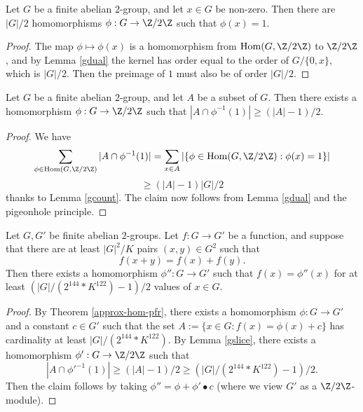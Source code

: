 \begin{lemma}[Counting]\label{gcount}\leanok Let $G$ be a finite abelian $2$-group, and let $x \in G$ be non-zero.  Then there are $|G|/2$ homomorphisms $\phi: G \to \Z/2\Z$ such that $\phi(x) = 1$.
\end{lemma}

\begin{proof} \leanok The map $\phi \mapsto \phi(x)$ is a homomorphism from $\mathrm{Hom}(G,\Z/2\Z)$ to $\Z/2\Z$, and by Lemma \ref{gdual} the kernel has order equal to the order of $G / \{0,x\}$, which is $|G|/2$.  Then the preimage of $1$ must also be of order $|G|/2$.
\end{proof}

\begin{lemma}[Slicing]\label{gslice}\leanok  Let $G$ be a finite abelian $2$-group, and let $A$ be a subset of $G$.  Then there exists a homomorphism $\phi: G \to \Z/2\Z$ such that $|A \cap \phi^{-1}(1)| \geq (|A|-1)/2$.
\end{lemma}

\begin{proof}\leanok  We have
  $$ \sum_{\phi \in \mathrm{Hom}(G,\Z/2\Z)} |A \cap \phi^{-1}(1)| = \sum_{x \in A} |\{ \phi \in \mathrm{Hom}(G,\Z/2\Z): \phi(x) = 1 \}|$$
  $$ \geq (|A|-1) |G|/2$$
  thanks to Lemma \ref{gcount}. The claim now follows from Lemma \ref{gdual} and the pigeonhole principle.
\end{proof}

\begin{corollary}\label{approx-hom-pfr-no-const}\leanok Let $G,G'$ be finite abelian $2$-groups.
  Let $f: G \to G'$ be a function, and suppose that there are at least $|G|^2 / K$ pairs $(x,y) \in G^2$ such that
$$ f(x+y) = f(x) + f(y).$$
Then there exists a homomorphism $\phi'': G \to G'$
such that $f(x) = \phi''(x)$ for at least $(|G| / (2 ^ {144} * K ^ {122}) - 1)/2$ values of $x \in G$.
\end{corollary}

\begin{proof}\leanok By Theorem \ref{approx-hom-pfr}, there exists a homomorphism $\phi: G \to G'$ and a constant $c \in G'$ such that the set $A := \{ x \in G: f(x) = \phi(x) + c\}$ has cardinality at least $|G| / (2 ^ {144} * K ^ {122})$.  By Lemma \ref{gslice}, there exists a homomorphism $\phi': G \to \Z/2\Z$ such that
$$ |A \cap \phi'^{-1}(1)| \geq (|A|-1)/2 \geq (|G| / (2 ^ {144} * K ^ {122}) - 1)/2.$$
Then the claim follows by taking $\phi'' = \phi + \phi' \bullet c$ (where we view $G'$ as a $\Z/2\Z$-module).
\end{proof}



